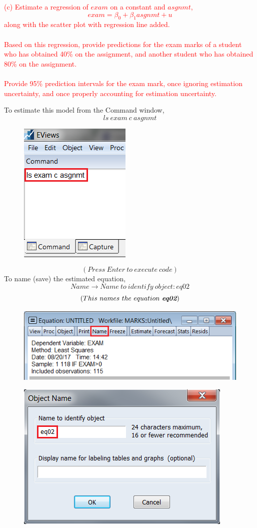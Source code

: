 \documentclass[12pt]{report}
\begin{document}
\newpage
\noindent \textcolor{red}
{
	(c) Estimate a regression of $exam$ on a constant and $asgnmt$,$$exam = \beta_0 + \beta_1asgnmt + u$$ along with the scatter plot with regression line added. \\ \\ Based on this regression, provide predictions for the exam marks of a student who has obtained 40\% on the assignment, and another student who has obtained 80\% on the assignment. \\ \\ Provide 95\% prediction intervals for the exam mark, once ignoring estimation uncertainty, and once properly accounting for estimation uncertainty.
}

\noindent To estimate this model from the Command window,
$$ls\ exam\ c\ asgnmt$$
\begin{figure}[H]
	\centering
	\includegraphics{tute8_q2_1}
\end{figure}
\vspace{-\baselineskip}
$$(Press\ Enter\ to\ execute\ code)$$
\noindent To name (save) the estimated equation,
$$Name \to Name\ to\ identify\ object: eq02$$
$$(This\ names\ the\ equation\ \textit{\textbf{eq02}})$$
\begin{figure}[H]
	\centering
	\includegraphics{q1_16}
\end{figure}
\vspace{-\baselineskip}
\begin{figure}[H]
	\centering
	\includegraphics{q1_17}
\end{figure}
\end{document}
